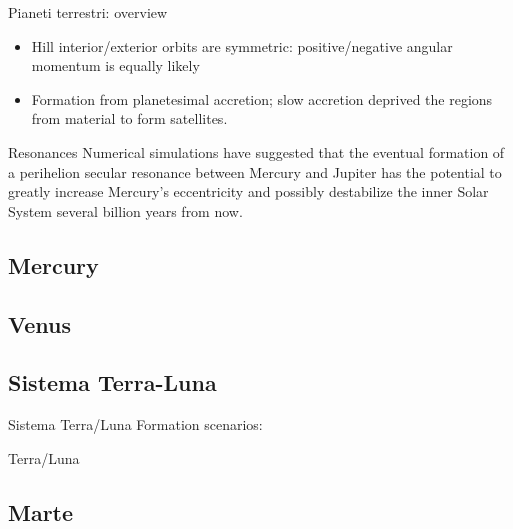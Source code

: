 \begin{wordonframe}{Pianeti terrestri: overview}
\begin{itemize}\item Hill interior/exterior orbits are symmetric: positive/negative angular momentum is equally likely
\item Formation from planetesimal accretion; slow accretion deprived the regions from material to form satellites.
\end{itemize}
\end{wordonframe}

\begin{block}{Resonances}
Numerical simulations have suggested that the eventual formation of a perihelion secular resonance between Mercury and Jupiter has the potential to greatly increase Mercury's eccentricity and possibly destabilize the inner Solar System several billion years from now.
\end{block}

\subsection{Mercury}


\subsection{Venus}


\subsection{Sistema Terra-Luna}
\begin{frame}{Sistema Terra/Luna}
\tolbf
Formation scenarios:
\end{frame}

\begin{wordonframe}{Terra/Luna}

\end{wordonframe}

\subsection{Marte}

